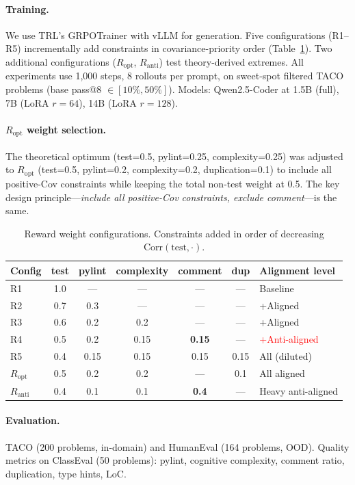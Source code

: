 \documentclass{article}
\newcommand{\Corr}{\mathrm{Corr}}
\newcommand{\Ropt}{R_{\mathrm{opt}}}
\newcommand{\Ranti}{R_{\mathrm{anti}}}
\begin{document}
\paragraph{Training.} We use TRL's GRPOTrainer with vLLM for generation. Five configurations (R1--R5) incrementally add constraints in covariance-priority order (Table~\ref{tab:reward_configs}). Two additional configurations ($\Ropt$, $\Ranti$) test theory-derived extremes. All experiments use 1,000 steps, 8 rollouts per prompt, on sweet-spot filtered TACO problems (base pass@8 $\in [10\%, 50\%]$). Models: Qwen2.5-Coder at 1.5B (full), 7B (LoRA $r\!=\!64$), 14B (LoRA $r\!=\!128$).

\paragraph{$\Ropt$ weight selection.} The theoretical optimum (test=0.5, pylint=0.25, complexity=0.25) was adjusted to $\Ropt$ (test=0.5, pylint=0.2, complexity=0.2, duplication=0.1) to include all positive-Cov constraints while keeping the total non-test weight at 0.5. The key design principle---\emph{include all positive-Cov constraints, exclude comment}---is the same.

\begin{table}[t]
\centering
\caption{Reward weight configurations. Constraints added in order of decreasing $\Corr(\text{test}, \cdot)$.}
\label{tab:reward_configs}
\begin{tabular}{lcccccl}
\toprule
Config & test & pylint & complexity & comment & dup & Alignment level \\
\midrule
R1 & 1.0 & --- & --- & --- & --- & Baseline \\
R2 & 0.7 & 0.3 & --- & --- & --- & +Aligned \\
R3 & 0.6 & 0.2 & 0.2 & --- & --- & +Aligned \\
R4 & 0.5 & 0.2 & 0.15 & \textbf{0.15} & --- & \textcolor{red}{+Anti-aligned} \\
R5 & 0.4 & 0.15 & 0.15 & 0.15 & 0.15 & All (diluted) \\
\midrule
$\Ropt$ & 0.5 & 0.2 & 0.2 & --- & 0.1 & All aligned \\
$\Ranti$ & 0.4 & 0.1 & 0.1 & \textbf{0.4} & --- & Heavy anti-aligned \\
\bottomrule
\end{tabular}
\end{table}

\paragraph{Evaluation.} TACO (200 problems, in-domain) and HumanEval (164 problems, OOD). Quality metrics on ClassEval (50 problems): pylint, cognitive complexity, comment ratio, duplication, type hints, LoC.
\end{document}
